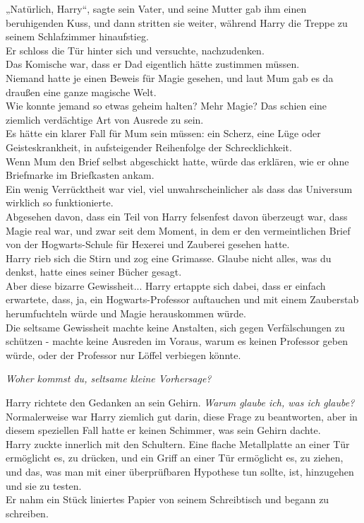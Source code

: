 {„Natürlich, Harry“, sagte sein Vater, und seine Mutter gab ihm einen beruhigenden Kuss, und dann stritten sie weiter, während Harry die Treppe zu seinem Schlafzimmer hinaufstieg.\\ Er schloss die Tür hinter sich und versuchte, nachzudenken.\\ Das Komische war, dass er Dad eigentlich hätte zustimmen müssen.\\ Niemand hatte je einen Beweis für Magie gesehen, und laut Mum gab es da draußen eine ganze magische Welt.\\ Wie konnte jemand so etwas geheim halten? Mehr Magie? Das schien eine ziemlich verdächtige Art von Ausrede zu sein.\\ Es hätte ein klarer Fall für Mum sein müssen: ein Scherz, eine Lüge oder Geisteskrankheit, in aufsteigender Reihenfolge der Schrecklichkeit.\\ Wenn Mum den Brief selbst abgeschickt hatte, würde das erklären, wie er ohne Briefmarke im Briefkasten ankam.\\ Ein wenig Verrücktheit war viel, viel unwahrscheinlicher als dass das Universum wirklich so funktionierte.\\ Abgesehen davon, dass ein Teil von Harry felsenfest davon überzeugt war, dass Magie real war, und zwar seit dem Moment, in dem er den vermeintlichen Brief von der Hogwarts-Schule für Hexerei und Zauberei gesehen hatte.\\ Harry rieb sich die Stirn und zog eine Grimasse. Glaube nicht alles, was du denkst, hatte eines seiner Bücher gesagt.\\ Aber diese bizarre Gewissheit... Harry ertappte sich dabei, dass er einfach erwartete, dass, ja, ein Hogwarts-Professor auftauchen und mit einem Zauberstab herumfuchteln würde und Magie herauskommen würde.\\ Die seltsame Gewissheit machte keine Anstalten, sich gegen Verfälschungen zu schützen - machte keine Ausreden im Voraus, warum es keinen Professor geben würde, oder der Professor nur Löffel verbiegen könnte.

\emph{Woher kommst du, seltsame kleine Vorhersage?}

Harry richtete den Gedanken an sein Gehirn. \emph{Warum glaube ich, was ich glaube?} Normalerweise war Harry ziemlich gut darin, diese Frage zu beantworten, aber in diesem speziellen Fall hatte er keinen Schimmer, was sein Gehirn dachte.\\ Harry zuckte innerlich mit den Schultern. Eine flache Metallplatte an einer Tür ermöglicht es, zu drücken, und ein Griff an einer Tür ermöglicht es, zu ziehen, und das, was man mit einer überprüfbaren Hypothese tun sollte, ist, hinzugehen und sie zu testen.\\ Er nahm ein Stück liniertes Papier von seinem Schreibtisch und begann zu schreiben.

}

